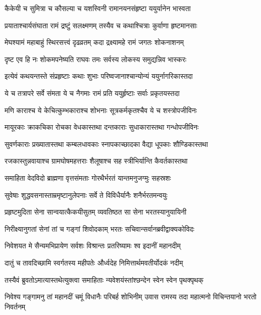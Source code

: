 \twolineshloka
{कैकेयी च सुमित्रा च कौसल्या च यशस्विनी}
{रामानयनसंहृष्टा ययुर्यानेन भास्वता} %

\twolineshloka
{प्रयाताश्चार्यसंघाता रामं द्रष्टुं सलक्ष्मणम्}
{तस्यैव च कथाश्चित्राः कुर्वाणा हृष्टमानसाः} %

\twolineshloka
{मेघश्यामं महाबाहुं स्थिरसत्त्वं दृढव्रतम्}
{कदा द्रक्ष्यामहे रामं जगतः शोकनाशनम्} %

\twolineshloka
{दृष्ट एव हि नः शोकमपनेष्यति राघवः}
{तमः सर्वस्य लोकस्य समुद्यन्निव भास्करः} %

\twolineshloka
{इत्येवं कथयन्तस्ते संप्रहृष्टाः कथाः शुभाः}
{परिष्वजानाश्चान्योन्यं ययुर्नागरिकास्तदा} %

\twolineshloka
{ये च तत्रापरे सर्वे संमता ये च नैगमाः}
{रामं प्रति ययुर्हृष्टाः सर्वाः प्रकृतयस्तदा} %

\twolineshloka
{मणि काराश्च ये केचित्कुम्भकाराश्च शोभनाः}
{सूत्रकर्मकृतश्चैव ये च शस्त्रोपजीविनः} %

\twolineshloka
{मायूरकाः क्राकचिका रोचका वेधकास्तथा}
{दन्तकाराः सुधाकारास्तथा गन्धोपजीविनः} %

\twolineshloka
{सुवर्णकाराः प्रख्यातास्तथा कम्बलधावकाः}
{स्नापकाच्छादका वैद्या धूपकाः शौण्डिकास्तथा} %

\twolineshloka
{रजकास्तुन्नवायाश्च ग्रामघोषमहत्तराः}
{शैलूषाश्च सह स्त्रीभिर्यान्ति कैवर्तकास्तथा} %

\twolineshloka
{समाहिता वेदविदो ब्राह्मणा वृत्तसंमताः}
{गोरथैर्भरतं यान्तमनुजग्मुः सहस्रशः} %

\twolineshloka
{सुवेषाः शुद्धवसनास्ताम्रमृष्टानुलेपनाः}
{सर्वे ते विविधैर्यानैः शनैर्भरतमन्वयुः} %

\twolineshloka
{प्रहृष्टमुदिता सेना सान्वयात्कैकयीसुतम्}
{व्यवतिष्ठत सा सेना भरतस्यानुयायिनी} %

\twolineshloka
{निरीक्ष्यानुगतां सेनां तां च गङ्गां शिवोदकाम्}
{भरतः सचिवान्सर्वानब्रवीद्वाक्यकोविदः} %

\twolineshloka
{निवेशयत मे सैन्यमभिप्रायेण सर्वशः}
{विश्रान्तः प्रतरिष्यामः श्व इदानीं महानदीम्} %

\twolineshloka
{दातुं च तावदिच्छामि स्वर्गतस्य महीपतेः}
{और्ध्वदेह निमित्तार्थमवतीर्योदकं नदीम्} %

\twolineshloka
{तस्यैवं ब्रुवतोऽमात्यास्तथेत्युक्त्वा समाहिताः}
{न्यवेशयंस्तांश्छन्देन स्वेन स्वेन पृथक्पृथक्} %

\fourlineindentedshloka
{निवेश्य गङ्गामनु तां महानदीं}
{ चमूं विधानैः परिबर्ह शोभिनीम्}
{उवास रामस्य तदा महात्मनो}
{ विचिन्तयानो भरतो निवर्तनम्} %



